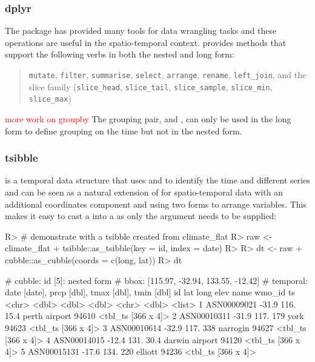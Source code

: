 \documentclass[
]{jss}
\begin{document}
\hypertarget{dplyr}{%
\subsubsection{dplyr}\label{dplyr}}

The  package has provided many tools for data wrangling
tasks and these operations are useful in the spatio-temporal context.
 provides methods that support the following 
verbs in both the nested and long form:

\begin{quote}
\texttt{mutate}, \texttt{filter}, \texttt{summarise}, \texttt{select},
\texttt{arrange}, \texttt{rename}, \texttt{left\_join}, and the slice
family (\texttt{slice\_head}, \texttt{slice\_tail},
\texttt{slice\_sample}, \texttt{slice\_min}, \texttt{slice\_max})
\end{quote}

\textcolor{red}{more work on groupby} The grouping pair, 
and , can only be used in the long form to define grouping
on the time but not in the nested form.

\hypertarget{tsibble}{%
\subsubsection{tsibble}\label{tsibble}}

 is a temporal data structure that uses  and
 to identify the time and different series and 
can be seen as a natural extension of  for spatio-temporal
data with an additional coordinates component and using two forms to
arrange variables. This makes it easy to cast a  into a
 as only the  argument needs to be supplied:

\begin{CodeChunk}
\begin{CodeInput}
R> # demonstrate with a tsibble created from climate_flat
R> raw <- climate_flat %
+   tsibble::as_tsibble(key = id, index = date) 
R> 
R> dt <-  raw %
+   cubble::as_cubble(coords = c(long, lat))
R> dt
\end{CodeInput}
\begin{CodeOutput}
# cubble:   id [5]: nested form
# bbox:     [115.97, -32.94, 133.55, -12.42]
# temporal: date [date], prcp [dbl], tmax [dbl], tmin [dbl]
  id            lat  long  elev name           wmo_id ts                
  <chr>       <dbl> <dbl> <dbl> <chr>           <dbl> <list>            
1 ASN00009021 -31.9  116.  15.4 perth airport   94610 <tbl_ts [366 x 4]>
2 ASN00010311 -31.9  117. 179   york            94623 <tbl_ts [366 x 4]>
3 ASN00010614 -32.9  117. 338   narrogin        94627 <tbl_ts [366 x 4]>
4 ASN00014015 -12.4  131.  30.4 darwin airport  94120 <tbl_ts [366 x 4]>
5 ASN00015131 -17.6  134. 220   elliott         94236 <tbl_ts [366 x 4]>
\end{CodeOutput}
\end{CodeChunk}
\end{document}
